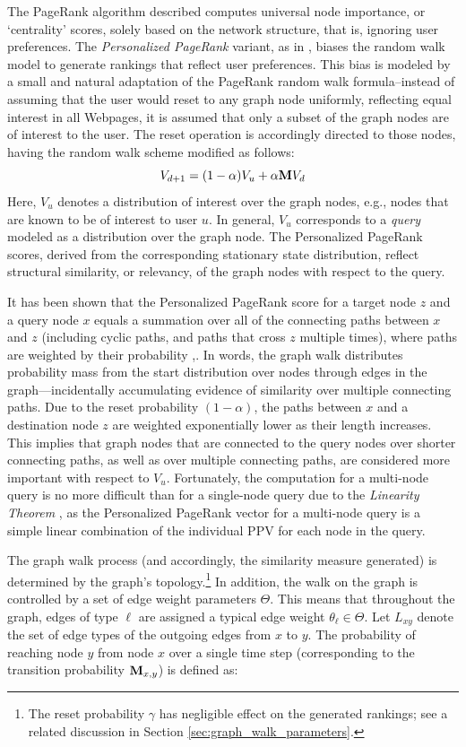 \documentclass[11pt,oneside]{book}
\newcommand{\transition}{{\bf M}}
\begin{document}
The PageRank algorithm described computes universal node importance,
or `centrality' scores, solely based on the network structure, that is,
ignoring user preferences. The {\it Personalized PageRank} variant, as in
\citep{richardson2001intelligent}, biases the random walk model to
generate rankings that reflect user preferences. This bias is modeled by
a small and natural adaptation of the PageRank random walk formula--instead of assuming that the user would reset to any graph node uniformly, reflecting equal interest in all Webpages, it is assumed that only a subset of the graph nodes are of interest to the user. The reset operation is accordingly directed to those nodes, having the random walk scheme modified as follows:
\begin{equation}
V_{d+1} = (1-\alpha) V_u + \alpha \transition V_d
\label{eq:ppr}
\end{equation}
Here, $V_u$ denotes a distribution of interest over the graph nodes,
e.g., nodes that are known to be of interest to user $u$. In general, $V_u$ corresponds to a {\it query} modeled as a distribution over the graph node. The
Personalized PageRank scores, derived from the corresponding stationary state distribution, reflect structural similarity, or relevancy, of the graph nodes with respect to the query. 

It has been shown that the Personalized PageRank score for a target node $z$ and a query node $x$ equals a summation over all of the connecting paths between $x$ and $z$ (including cyclic paths, and paths that cross $z$ multiple times), where paths are weighted by their probability \citep{jeh2003scaling},\citep{fogaras2004towards}. In words, the graph walk
distributes probability mass from the start distribution over nodes through edges in the graph---incidentally accumulating evidence of similarity over multiple connecting paths. Due to the reset probability $(1- \alpha)$, the paths between $x$ and a destination node $z$ are weighted exponentially lower as their length
increases. This implies that graph nodes that are connected to the query nodes over shorter connecting paths, as well as over multiple connecting paths, are considered more important with respect to $V_u$. Fortunately, the computation for a multi-node query is no more difficult than for a single-node query due to the
\textit{Linearity Theorem} \citep{jeh2003scaling}, as the Personalized
PageRank vector for a multi-node query is a simple linear combination
of the individual PPV for each node in the query.

\iffalse
The graph walk process (and accordingly, the similarity measure
generated) is determined by the graph's topology.\footnote{The reset
probability $\gamma$ has negligible effect on the generated rankings;
see a related discussion in Section \ref{sec:graph_walk_parameters}.}
In addition, the walk on the graph is controlled by a set of edge
weight parameters $\Theta$. This means that throughout the graph,
edges of type $\ell$ are assigned a typical edge weight $\theta_{\ell}
\in \Theta$. Let $L_{xy}$ denote the set of edge types of the outgoing
edges from $x$ to $y$. The probability of reaching node $y$ from node
$x$ over a single time step (corresponding to the transition
probability $\transition_{x,y}$) is defined as:
\end{document}
